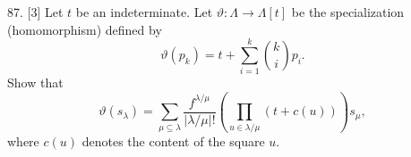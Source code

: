 87. [3] Let $t$ be an indeterminate. Let $\vartheta:\Lambda\to\Lambda[t]$ be the specialization (homomorphism) defined by
\[
\vartheta(p_k)=t+\sum_{i=1}^{k}\binom{k}{i}p_i.
\]
Show that
\[
\vartheta(s_\lambda)=\sum_{\mu\subseteq\lambda}\frac{f^{\lambda/\mu}}{|\lambda/\mu|!}\left(\prod_{u\in\lambda/\mu}(t+c(u))\right)s_\mu,
\]
where $c(u)$ denotes the content of the square $u$.
